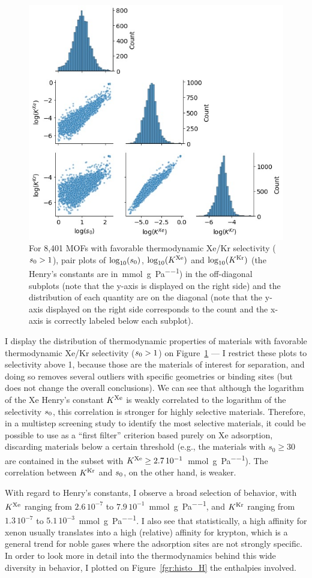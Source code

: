 \documentclass[main.tex]{subfiles}
\begin{document}
\begin{figure}[t]
\centering
  \includegraphics[width=0.6\linewidth]{figures/2-thermo/Henry_0.jpg}
  \caption{For 8,401 MOFs with favorable thermodynamic Xe/Kr selectivity ($s_{\text{0}} > 1$), pair plots of $\log_{\text{10}}(s_{\text{0}})$, $\log_{\text{10}}(K^{\text{Xe}})$ and $\log_{\text{10}}(K^{\text{Kr}})$ (the Henry's constants are in~\si{\milli\mol\per\gram\per\pascal}) in the off-diagonal subplots (note that the y-axis is displayed on the right side) and the distribution of each quantity are on the diagonal (note that the y-axis displayed on the right side corresponds to the count and the x-axis is correctly labeled below each subplot).}\label{fgr:histo_K}
\end{figure}


I display the distribution of thermodynamic properties of materials with favorable thermodynamic Xe/Kr selectivity ($s_{\text{0}} > 1$) on Figure~\ref{fgr:histo_K} --- I restrict these plots to selectivity above 1, because those are the materials of interest for separation, and doing so removes several outliers with specific geometries or binding sites (but does not change the overall conclusions). We can see that although the logarithm of the Xe Henry's constant $K^{\text{Xe}}$ is weakly correlated to the logarithm of the selectivity $s_{\text{0}}$, this correlation is stronger for highly selective materials. Therefore, in a multistep screening study to identify the most selective materials, it could be possible to use as a ``first filter'' criterion based purely on Xe adsorption, discarding materials below a certain threshold (e.g., the materials with $s_0\ge30$ are contained in the subset with $K^{\text{Xe}}\ge2.7\,10^{-1}$~\si{\milli\mol\per\gram\per\pascal}). The correlation between $K^{\text{Kr}}$ and $s_{\text{0}}$, on the other hand, is weaker.

With regard to Henry's constants, I observe a broad selection of behavior, with $K^{\text{Xe}}$ ranging from $2.6\,10^{-7}$ to $7.9\,10^{-1}$~\si{\milli\mole\per\gram\per\pascal}, and $K^{\text{Kr}}$ ranging from $1.3\,10^{-7}$ to $5.1\,10^{-3}$~\si{\milli\mole\per\gram\per\pascal}. I also see that statistically, a high affinity for xenon usually translates into a high (relative) affinity for krypton, which is a general trend for noble gases where the adsorption sites are not strongly specific. In order to look more in detail into the thermodynamics behind this wide diversity in behavior, I plotted on Figure~\ref{fgr:histo_H} the enthalpies involved.
\end{document}
